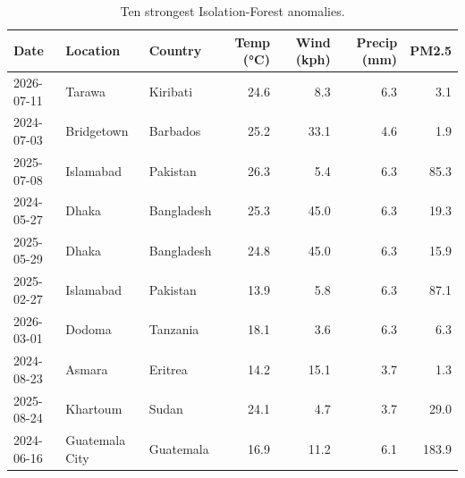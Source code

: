 \begin{table}
\caption{Ten strongest Isolation-Forest anomalies.}
\label{tab:anomalies}
\begin{tabular}{lllrrrr}
\toprule
Date & Location & Country & Temp (°C) & Wind (kph) & Precip (mm) & PM2.5 \\
\midrule
2026-07-11 & Tarawa & Kiribati & 24.6 & 8.3 & 6.3 & 3.1 \\
2024-07-03 & Bridgetown & Barbados & 25.2 & 33.1 & 4.6 & 1.9 \\
2025-07-08 & Islamabad & Pakistan & 26.3 & 5.4 & 6.3 & 85.3 \\
2024-05-27 & Dhaka & Bangladesh & 25.3 & 45.0 & 6.3 & 19.3 \\
2025-05-29 & Dhaka & Bangladesh & 24.8 & 45.0 & 6.3 & 15.9 \\
2025-02-27 & Islamabad & Pakistan & 13.9 & 5.8 & 6.3 & 87.1 \\
2026-03-01 & Dodoma & Tanzania & 18.1 & 3.6 & 6.3 & 6.3 \\
2024-08-23 & Asmara & Eritrea & 14.2 & 15.1 & 3.7 & 1.3 \\
2025-08-24 & Khartoum & Sudan & 24.1 & 4.7 & 3.7 & 29.0 \\
2024-06-16 & Guatemala City & Guatemala & 16.9 & 11.2 & 6.1 & 183.9 \\
\bottomrule
\end{tabular}
\end{table}
